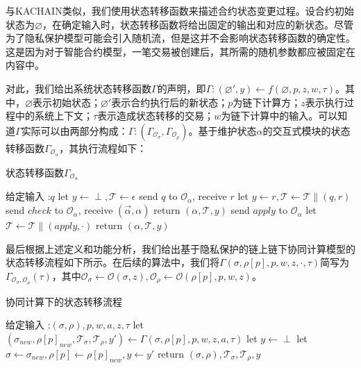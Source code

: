 与KACHAIN\cite{9505181}类似，我们使用状态转移函数来描述合约状态变更过程。设合约初始状态为$\varnothing$，在确定输入时，状态转移函数将给出固定的输出和对应的新状态。尽管为了隐私保护模型可能会引入随机流，但是这并不会影响状态转移函数的确定性。这是因为对于智能合约模型，一笔交易被创建后，其所需的随机参数都应被固定在内容中。

对此，我们给出系统状态转移函数$\Gamma$的声明，即$\Gamma:(\varnothing', y) \leftarrow f(\varnothing, p, z, w,\tau)$。其中，$\varnothing$表示初始状态；$\varnothing'$表示合约执行后的新状态；$p$为链下计算方；$z$表示执行过程中的系统上下文；$\tau$表示造成状态转移的交易；$w$为链下计算中的输入。可以知道$\Gamma$实际可以由两部分构成：$\Gamma: (\Gamma_{\mathcal{O}_\sigma}, \Gamma_{\mathcal{O}_\rho})$。基于维护状态$\alpha$的交互式模块的状态转移函数$\Gamma_{\mathcal{O}_\alpha}$，其执行流程如下：

\begin{breakablealgorithm}
    \caption{状态转移函数$\Gamma_{\mathcal{O}_\alpha}$}
    \label{alg:ch3-3}
    \begin{algorithmic} 
        \item[给定输入]:$q$
        \STATE let $y \leftarrow \perp, \mathcal{T} \leftarrow \epsilon$
        \STATE send $q$ to $\mathcal{O}_\alpha$, receive $r$
        \STATE let $y \leftarrow r, \mathcal{T} \leftarrow \mathcal{T} \parallel (q, r)$
        \STATE send $check$ to $\mathcal{O}_\alpha$, receive $(\vec{\alpha}, \alpha)$
        \STATE return $(\alpha, \mathcal{T}, y)$
        \ENDIF
        \STATE send $apply$ to $\mathcal{O}_\alpha$
        \STATE let $\mathcal{T} \leftarrow \mathcal{T} \parallel (apply, \cdot)$
        \STATE return $(\alpha, \mathcal{T}, y)$
    \end{algorithmic}
\end{breakablealgorithm}

最后根据上述定义和功能分析，我们给出基于隐私保护的链上链下协同计算模型的状态转移流程如下所示。在后续的算法中，我们将$\Gamma(\sigma, \rho[p], p, w, z, \cdot, \tau)$简写为$\Gamma_{\mathcal{O}_\sigma, \mathcal{O}_\rho}(\tau)$，其中$\mathcal{O}_\sigma \leftarrow \mathcal{O}(\sigma, z), \mathcal{O}_\rho \leftarrow \mathcal{O}(\rho[p], p, w, z)$。

\begin{breakablealgorithm}
    \caption{协同计算下的状态转移流程}
    \label{alg:ch3-4}
    \begin{algorithmic} 
        \item [给定输入]:$(\sigma, \rho), p, w, a, z, \tau$
        \STATE let $(\sigma_{new}, \rho[p]_{new},\mathcal{T}_\sigma, \mathcal{T}_\rho, y') \leftarrow \Gamma(\sigma, \rho[p], p, w, z, a, \tau)$
        \STATE let $y \leftarrow \perp$
        \STATE let $\sigma \leftarrow \sigma_{new}, \rho[p] \leftarrow \rho[p]_{new}, y \leftarrow y'$
        \STATE return $(\sigma, \rho), \mathcal{T}_\sigma, \mathcal{T}_\rho, y$
    \end{algorithmic}
\end{breakablealgorithm}

